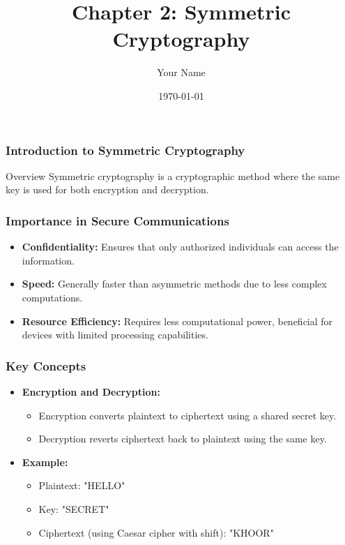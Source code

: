 \documentclass{beamer}
\title{Chapter 2: Symmetric Cryptography}
\author{Your Name}
\institute{Your Institution}
\date{\today}
\begin{document}
\frame{\titlepage}

\begin{frame}[fragile]
    \frametitle{Introduction to Symmetric Cryptography}
    \begin{block}{Overview}
        Symmetric cryptography is a cryptographic method where the same key is used for both encryption and decryption. 
    \end{block}
\end{frame}

\begin{frame}[fragile]
    \frametitle{Importance in Secure Communications}
    \begin{itemize}
        \item \textbf{Confidentiality:} Ensures that only authorized individuals can access the information.
        \item \textbf{Speed:} Generally faster than asymmetric methods due to less complex computations.
        \item \textbf{Resource Efficiency:} Requires less computational power, beneficial for devices with limited processing capabilities.
    \end{itemize}
\end{frame}

\begin{frame}[fragile]
    \frametitle{Key Concepts}
    \begin{itemize}
        \item \textbf{Encryption and Decryption:}
        \begin{itemize}
            \item Encryption converts plaintext to ciphertext using a shared secret key.
            \item Decryption reverts ciphertext back to plaintext using the same key.
        \end{itemize}
        
        \item \textbf{Example:}
        \begin{itemize}
            \item Plaintext: "HELLO"
            \item Key: "SECRET"
            \item Ciphertext (using Caesar cipher with shift): "KHOOR"
        \end{itemize}
    \end{itemize}
\end{frame}
\end{document}

